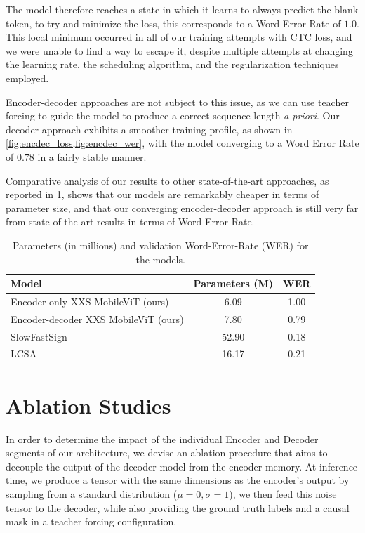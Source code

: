 \documentclass{IEEEtran}
\begin{document}
The model therefore reaches a state in which it learns to always predict the blank token, to try and minimize the loss, this corresponds to a Word Error Rate of $1.0$. This local minimum occurred in all of our training attempts with CTC loss, and we were unable to find a way to escape it, despite multiple attempts at changing the learning rate, the scheduling algorithm, and the regularization techniques employed.

Encoder-decoder approaches are not subject to this issue, as we can use teacher forcing to guide the model to produce a correct sequence length \textit{a priori}. Our decoder approach exhibits a smoother training profile, as shown in \cref{fig:encdec_loss,fig:encdec_wer}, with the model converging to a Word Error Rate of $0.78$ in a fairly stable manner.

Comparative analysis of our results to other state-of-the-art approaches, as reported in \cref{tab:res}, shows that our models are remarkably cheaper in terms of parameter size, and that our converging encoder-decoder approach is still very far from state-of-the-art results in terms of Word Error Rate.


\begin{table}[h]
    \centering
    \caption{Parameters (in millions) and validation Word-Error-Rate (WER) for the models.}\label{tab:res}
        \begin{tabular}{lcc}
            \toprule
            \textbf{Model} & \textbf{Parameters (M)} & \textbf{WER} \\
            \midrule
            Encoder-only XXS MobileViT (ours) & 6.09 & 1.00 \\
            Encoder-decoder XXS MobileViT (ours) & 7.80 & 0.79 \\
            SlowFastSign\cite{ahn_slowfast_2023} & 52.90 & 0.18 \\
            LCSA\cite{zuo_local_2022} & 16.17 & 0.21 \\
            \bottomrule
        \end{tabular}
\end{table}

\section{Ablation Studies}

In order to determine the impact of the individual Encoder and Decoder segments of our architecture, we devise an ablation procedure that aims to decouple the output of the decoder model from the encoder memory. At inference time, we produce a tensor with the same dimensions as the encoder's output by sampling from a standard distribution ($\mu = 0, \sigma = 1$), we then feed this noise tensor to the decoder, while also providing the ground truth labels and a causal mask in a teacher forcing configuration.
\end{document}
